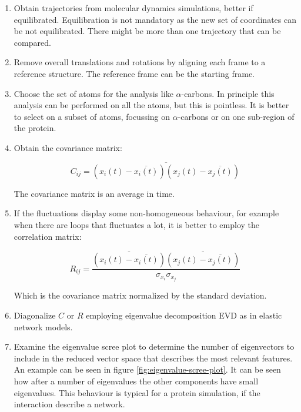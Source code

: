 \begin{enumerate}
	\item Obtain trajectories from molecular dynamics simulations, better if equilibrated.
		Equilibration is not mandatory as the new set of coordinates can be not equilibrated.
		There might be more than one trajectory that can be compared.
	\item Remove overall translations and rotations by aligning each frame to a reference structure.
		The reference frame can be the starting frame.
	\item Choose the set of atoms for the analysis like $\alpha$-carbons.
		In principle this analysis can be performed on all the atoms, but this is pointless.
		It is better to select on a subset of atoms, focussing on $\alpha$-carbons or on one sub-region of the protein.
	\item Obtain the covariance matrix:

		$$C_{ij} = \overline{(x_i(t) - \overline{x_i(t)})(x_j(t)-\overline{x_j(t)})}$$

		The covariance matrix is an average in time.
	\item If the fluctuations display some non-homogeneous behaviour, for example when there are loops that fluctuates a lot, it is better to employ the correlation matrix:

		$$R_{ij} = \frac{\overline{(x_i(t)-\overline{x_i(t)})}\overline{(x_j(t)-\overline{x_j(t)})}}{\sigma_{x_i}\sigma_{x_j}}$$

		Which is the covariance matrix normalized by the standard deviation.
	\item Diagonalize $C$ or $R$ employing eigenvalue decomposition EVD as in elastic network models.
	\item Examine the eigenvalue scree plot to determine the number of eigenvectors to include in the reduced vector space that describes the most relevant features.
		An example can be seen in figure \ref{fig:eigenvalue-scree-plot}.
		It can be seen how after a number of eigenvalues the other components have small eigenvalues.
		This behaviour is typical for a protein simulation, if the interaction describe a network.


\end{enumerate}
